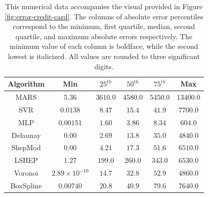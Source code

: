 \documentclass[smallextended,final]{svjour3}       %
\begin{document}
\begin{appendix}
\begin{table}
  \centering
  \begin{tabular}{c|c|c|c|c|c}
    \hline
    Algorithm & Min & $25^{th}$ & $50^{th}$ & $75^{th}$ & Max\\
    \hline
    MARS & $5.36$ & $3610.0$ & $4580.0$ & $5450.0$ & $13400.0$\\
    SVR & $0.0138$ & $8.47$ & $15.4$ & $41.9$ & $7700.0$\\
    MLP & $0.00151$ & $\mathbf{1.60}$ & $\mathbf{3.86}$ & $\mathbf{8.34}$ & $\mathbf{604.0}$\\
    Delaunay & $\mathbf{0.00}$ & $\mathit{2.69}$ & $\mathit{13.8}$ & $\mathit{35.0}$ & $\mathit{4840.0}$\\
    ShepMod & $\mathbf{0.00}$ & $4.21$ & $17.3$ & $51.6$ & $6510.0$\\
    LSHEP & $1.27$ & $199.0$ & $260.0$ & $343.0$ & $6530.0$\\
    Voronoi & $\mathit{2.89 \times 10^{-10}}$ & $14.7$ & $32.8$ & $52.9$ & $4860.0$\\
    BoxSpline & $0.00740$ & $20.8$ & $40.9$ & $79.6$ & $7640.0$\\
    \hline
  \end{tabular}
  \caption{This numerical data accompanies the visual provided in
    Figure \ref{fig:error-credit-card}. The columns of absolute error
    percentiles correspond to the minimum, first quartile, median,
    second quartile, and maximum absolute errors respectively. The
    minimum value of each column is boldface, while the second lowest
    is italicized. All values are rounded to three significant
    digits.}
  \label{table:error-credit-card}
\end{table}


\end{appendix}
\end{document}
